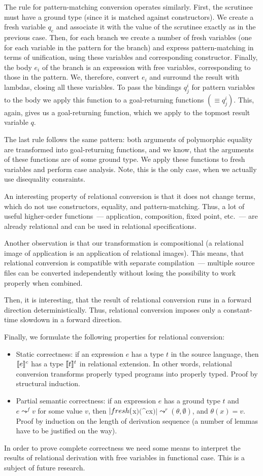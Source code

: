 The rule for pattern-matching conversion operates similarly. First, the scrutinee must have a ground type (since it is matched against
constructors). We create a fresh variable $q_e$ and associate it with the value of the scrutinee exactly as in the previous
case. Then, for each branch we create a number of fresh variables (one for each variable in the pattern for the branch) and
express pattern-matching in terms of unification, using these variables and corresponding constructor. Finally, the body $e_i$ of the branch
is an expression with free variables, corresponding to those in the pattern. We, therefore, convert $e_i$ and surround the result with
lambdas, closing all these variables. To pass the bindings $q^i_j$ for pattern variables to the body we apply this function to
a goal-returning functions $(\equiv q^i_j)$. This, again, gives us a goal-returning function, which we apply to the topmost result variable $q$.

The last rule follows the same pattern: both arguments of polymorphic equality are transformed into goal-returning functions, and we know, that
the arguments of these functions are of some ground type. We apply these functions to fresh variables and perform case analysis. Note, this is
the only case, when we actually use disequality consraints.

An interesting property of relational conversion is that it does not change terms, which do not use constructors, equality, and pattern-matching. Thus,
a lot of useful higher-order functions~--- application, composition, fixed point, etc.~--- are already relational and can be used in
relational specifications.

Another observation is that our transformation is compositional (a relational image of application is an application of relational
images). This means, that relational conversion is compatible with separate compilation~--- multiple source files can be
converted independently without losing the possibility to work properly when combined.

Then, it is interesting, that the result of relational conversion runs in a forward direction
deterministically. Thus, relational conversion imposes only a constant-time slowdown in a forward
direction.

Finally, we formulate the following properties for relational conversion:

\begin{itemize}
\item Static correctness: if an expression $e$ has a type $t$ in the source language, then $\llbracket{e}\rrbracket^c$ has a 
type $\llbracket{t}\rrbracket^t$ in relational extension. In other words, relational conversion transforms properly typed
programs into properly typed. Proof by structural induction.
\item Partial semantic correctness: if an expression $e$ has a ground type $t$ and $e \leadsto^f v$ for some
  value $v$, then $\lstinline|fresh($x$)($^c\;x$)| \leadsto^r (\theta,\emptyset)$, and $\theta(x)=v$. Proof
by induction on the length of derivation sequence (a number of lemmas have to be justified on the way).
\end{itemize}

In order to prove complete correctness we need some means to interpret the results of relational 
derivation with free variables in functional case. This is a subject of future research.
